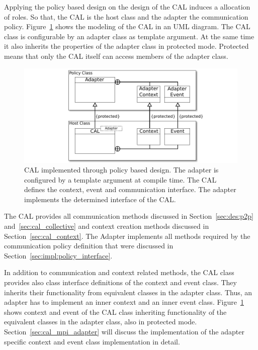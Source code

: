 Applying the policy based design on the design of the CAL induces a
allocation of roles. So that, the CAL is the host class and the
adapter the communication policy. Figure~\ref{fig:cal_uml} shows the
modeling of the CAL in an UML diagram. The CAL class is configurable
by an adapter class as template argument. At the same time it also
inherits the properties of the adapter class in protected
mode. Protected means that only the CAL itself can access members of
the adapter class.

\begin{figure}[H]
  \centering \includegraphics[width=\textwidth]{graphics/40_cal_uml}
  \caption{CAL implemented through policy based design. The adapter is
    configured by a template argument at compile time. The CAL defines
    the context, event and communication interface. The adapter
    implements the determined interface of the CAL.}
  \label{fig:cal_uml}
\end{figure}

\noindent The CAL provides all communication methods discussed in
Section~\ref{sec:des:p2p} and~\ref{sec:cal_collective} and context
creation methods discussed in Section~\ref{sec:cal_context}. The
Adapter implements all methods required by the communication policy
definition that were discussed in
Section~\ref{sec:impl:policy_interface}.

In addition to communication and context related methods, the CAL
class provides also class interface definitions of the context and
event class. They inherits their functionality from equivalent classes
in the adapter class. Thus, an adapter has to implement an inner
context and an inner event class.  Figure~\ref{fig:cal_uml} shows
context and event of the CAL class inheriting functionality of the
equivalent classes in the adapter class, also in protected
mode. Section~\ref{sec:cal_mpi_adapter} will discuss the
implementation of the adapter specific context and event class
implementation in detail.

